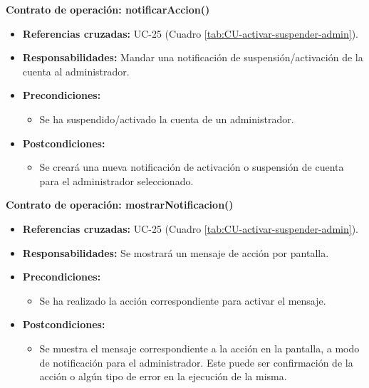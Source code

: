 \textbf{Contrato de operación: notificarAccion()}
\begin{itemize}
\item \textbf{Referencias cruzadas:} UC-25 (Cuadro \ref{tab:CU-activar-suspender-admin}).
\item \textbf{Responsabilidades:} Mandar una notificación de suspensión/activación de la cuenta al administrador.
\item \textbf{Precondiciones:} 
 \begin{itemize}
\item Se ha suspendido/activado la cuenta de un administrador.
\end {itemize}
\item \textbf{Postcondiciones:} 
 \begin{itemize}
\item Se creará una nueva notificación de activación o suspensión de cuenta para el administrador seleccionado.
\end {itemize}
\end {itemize}

\textbf{Contrato de operación: mostrarNotificacion()}
\begin{itemize}
\item \textbf{Referencias cruzadas:} UC-25 (Cuadro \ref{tab:CU-activar-suspender-admin}).
\item \textbf{Responsabilidades:} Se mostrará un mensaje de acción por pantalla.
\item \textbf{Precondiciones:} 
 \begin{itemize}
\item Se ha realizado la acción correspondiente para activar el mensaje.
\end {itemize}
\item \textbf{Postcondiciones:} 
 \begin{itemize}
\item Se muestra el mensaje correspondiente a la acción en la pantalla, a modo de notificación para el administrador. Este puede ser confirmación de la acción o algún tipo de error en la ejecución de la misma.
\end {itemize}
\end {itemize}


\vspace{10mm}

